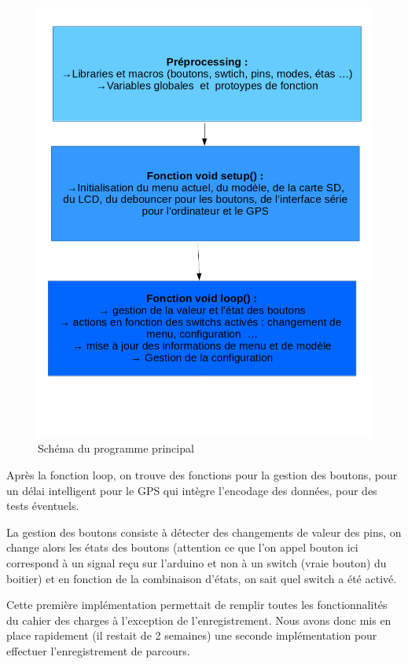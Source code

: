 \documentclass{report}
\begin{document}
\begin{figure}[H]
	\begin{center}
		\includegraphics[scale=0.5]{schemaProgramme.png}
	\end{center}
	\caption{Schéma du programme principal}
\end{figure}

Après la fonction loop, on trouve des fonctions pour la gestion
des boutons, pour un délai intelligent pour le GPS qui intègre l'encodage
des données, pour des tests éventuels.

La gestion des boutons consiste à détecter des changements de valeur
des pins, on change alors les états des boutons (attention ce que l'on
appel bouton ici correspond à un signal reçu sur l'arduino et non
à un switch (vraie bouton) du boitier) et en fonction
de la combinaison d'états, on sait quel switch a été activé.

Cette première implémentation permettait de remplir toutes les
fonctionnalités du cahier des charges à l'exception de l'enregistrement.
Nous avons donc mis en place rapidement (il restait de 2 semaines)
une seconde implémentation pour effectuer l'enregistrement de parcours.
\end{document}
